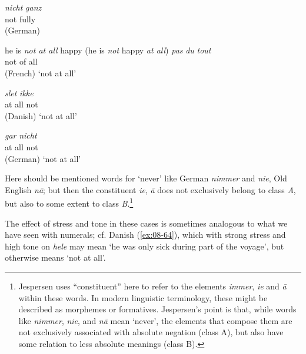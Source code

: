 \ex
\gll \emph{nicht} \emph{ganz}\\
 not fully\\\hfill(German)
\z
\z


\ea \label{ex:08-63} 
\ea he is \emph{not at all} happy (he is \emph{not} happy \emph{at all})
\ex
\gll \emph{pas} \emph{du} \emph{tout}\\
 not of all\\\hfill(French)
\glt `not at all'

\ex{}
\gll \emph{slet} \emph{ikke}\\
 {at all} not\\\hfill(Danish)
\glt `not at all'

\ex
\gll \emph{gar} \emph{nicht}\\
 {at all} not\\\hfill(German)
\glt `not at all'
\z
\z
{}

Here should be mentioned words for `never' like German \textit{nimmer} and \textit{nie}, Old English \textit{nā}; but then the constituent \textit{ie}, \textit{ā} does not exclusively belong to class \textit{A}, but also to some extent to class \textit{B}.\footnote{Jespersen uses ``constituent'' %
here to refer to the elements \textit{immer}, \textit{ie} and \textit{ā} within these words. In modern linguistic terminology, these might be described as morphemes or formatives. Jespersen's point is that, while words like \textit{nimmer}, \textit{nie}, and \textit{nā} mean `never', the elements that compose them are not exclusively associated with absolute negation (class A), but also have some relation to less absolute meanings (class B). \eds} %

The effect of stress and tone in these cases is sometimes analogous to what we have seen with numerals; cf. Danish (\ref{ex:08-64}), which with strong stress and high tone on \textit{hele} may mean `he was only sick during part of the voyage', but otherwise means `not at all'.

